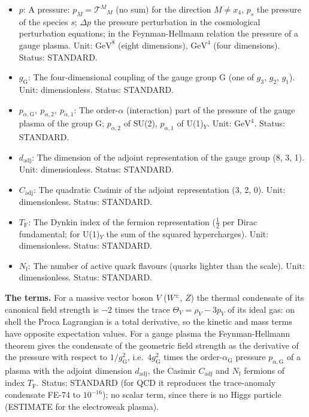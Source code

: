 \documentclass[
  10pt,
]{article}
\begin{document}
\begin{itemize}
  \(\partial\): A partial derivative: \(\partial_M\) is the derivative
  with respect to the coordinate \(X^M\), \(\partial_y\) with respect to
  \(y\), \(\partial_{x_4}\) with respect to the time \(x_4\),
  \(\partial X/\partial Y\) the derivative of \(X\) with respect to
  \(Y\) at fixed other variables. Status: STANDARD.
\item
  \(p\): A pressure: \(p_M = \mathcal{T}^M{}_M\) (no sum) for the
  direction \(M \ne x_4\), \(p_s\) the pressure of the species \(s\);
  \(\Delta p\) the pressure perturbation in the cosmological
  perturbation equations; in the Feynman-Hellmann relation the pressure
  of a gauge plasma. Unit: \(\mathrm{GeV}^{8}\) (eight dimensions),
  \(\mathrm{GeV}^{4}\) (four dimensions). Status: STANDARD.
\item
  \(g_{\mathrm{G}}\): The four-dimensional coupling of the gauge group G
  (one of \(g_3\), \(g_2\), \(g_1\)). Unit: dimensionless. Status:
  STANDARD.
\item
  \(p_{\alpha,\mathrm{G}},\ p_{\alpha,2},\ p_{\alpha,1}\): The
  order-\(\alpha\) (interaction) part of the pressure of the gauge
  plasma of the group G; \(p_{\alpha,2}\) of SU(2), \(p_{\alpha,1}\) of
  U(1)\(_Y\). Unit: \(\mathrm{GeV}^{4}\). Status: STANDARD.
\item
  \(d_{\mathrm{adj}}\): The dimension of the adjoint representation of
  the gauge group (8, 3, 1). Unit: dimensionless. Status: STANDARD.
\item
  \(C_{\mathrm{adj}}\): The quadratic Casimir of the adjoint
  representation (3, 2, 0). Unit: dimensionless. Status: STANDARD.
\item
  \(T_{\mathrm{F}}\): The Dynkin index of the fermion representation
  (\(\frac12\) per Dirac fundamental; for U(1)\(_Y\) the sum of the
  squared hypercharges). Unit: dimensionless. Status: STANDARD.
\item
  \(N_{\mathrm{f}}\): The number of active quark flavours (quarks
  lighter than the scale). Unit: dimensionless. Status: STANDARD.
\end{itemize}

\textbf{The terms.} For a massive vector boson \(V\) (\(W^\pm\), \(Z\))
the thermal condensate of its canonical field strength is \(-2\) times
the trace \(\Theta_V = \rho_V - 3p_V\) of its ideal gas: on shell the
Proca Lagrangian is a total derivative, so the kinetic and mass terms
have opposite expectation values. For a gauge plasma the
Feynman-Hellmann theorem gives the condensate of the geometric field
strength as the derivative of the pressure with respect to
\(1/g_{\mathrm{G}}^2\), i.e.~\(4g_{\mathrm{G}}^2\) times the
order-\(\alpha_{\mathrm{G}}\) pressure \(p_{\alpha,\mathrm{G}}\) of a
plasma with the adjoint dimension \(d_{\mathrm{adj}}\), the Casimir
\(C_{\mathrm{adj}}\) and \(N_{\mathrm{f}}\) fermions of index
\(T_{\mathrm{F}}\). Status: STANDARD (for QCD it reproduces the
trace-anomaly condensate FE-74 to \(10^{-16}\)); no scalar term, since
there is no Higgs particle (ESTIMATE for the electroweak plasma).
\end{document}
